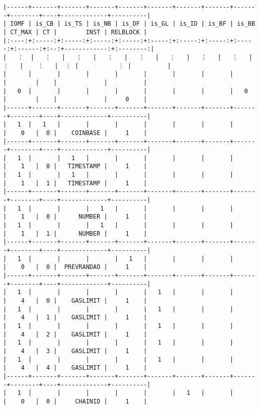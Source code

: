 \documentclass[varwidth=\maxdimen,margin=0.5cm,multi={verbatim}]{standalone}
\begin{document}
\begin{verbatim}
|------+-------+-------+-------+-------+-------+-------+-------+-------+--------+----+-------------+----------|
| IOMF | is_CB | is_TS | is_NB | is_DF | is_GL | is_ID | is_BF | is_BB | CT_MAX | CT |        INST | RELBLOCK |
|:----:+:-----:+:-----:+:-----:+:-----:+:-----:+:-----:+:-----:+:-----:+:------:+:--:+------------:+:--------:|
|   ⋮  |   ⋮   |   ⋮   |   ⋮   |   ⋮   |   ⋮   |   ⋮   |   ⋮   |   ⋮   |    ⋮   |  ⋮ |           ⋮ |          |
|      |       |       |       |       |       |       |       |       |        |    |             |          |
|   0  |       |       |       |       |       |       |       |   0   |        |    |             |     0    |
|------+-------+-------+-------+-------+-------+-------+-------+-------+--------+----+-------------+----------|
|   1  |   1   |       |       |       |       |       |       |       |    0   |  0 |    COINBASE |     1    |
|------+-------+-------+-------+-------+-------+-------+-------+-------+--------+----+-------------+----------|
|   1  |       |   1   |       |       |       |       |       |       |    1   |  0 |   TIMESTAMP |     1    |
|   1  |       |   1   |       |       |       |       |       |       |    1   |  1 |   TIMESTAMP |     1    |
|------+-------+-------+-------+-------+-------+-------+-------+-------+--------+----+-------------+----------|
|   1  |       |       |   1   |       |       |       |       |       |    1   |  0 |      NUMBER |     1    |
|   1  |       |       |   1   |       |       |       |       |       |    1   |  1 |      NUMBER |     1    |
|------+-------+-------+-------+-------+-------+-------+-------+-------+--------+----+-------------+----------|
|   1  |       |       |       |   1   |       |       |       |       |    0   |  0 |  PREVRANDAO |     1    |
|------+-------+-------+-------+-------+-------+-------+-------+-------+--------+----+-------------+----------|
|   1  |       |       |       |       |   1   |       |       |       |    4   |  0 |    GASLIMIT |     1    |
|   1  |       |       |       |       |   1   |       |       |       |    4   |  1 |    GASLIMIT |     1    |
|   1  |       |       |       |       |   1   |       |       |       |    4   |  2 |    GASLIMIT |     1    |
|   1  |       |       |       |       |   1   |       |       |       |    4   |  3 |    GASLIMIT |     1    |
|   1  |       |       |       |       |   1   |       |       |       |    4   |  4 |    GASLIMIT |     1    |
|------+-------+-------+-------+-------+-------+-------+-------+-------+--------+----+-------------+----------|
|   1  |       |       |       |       |       |   1   |       |       |    0   |  0 |     CHAINID |     1    |

\end{verbatim}
\end{document}
